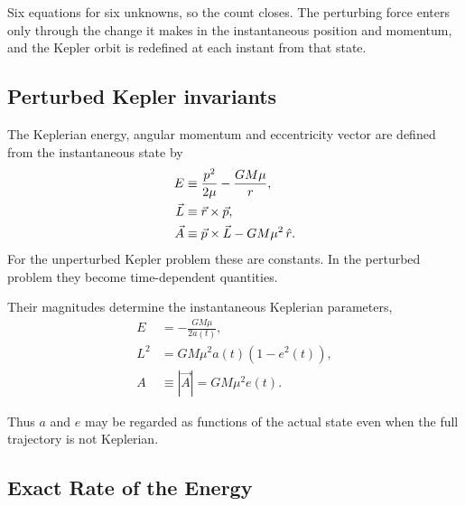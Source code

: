 	Six equations for six unknowns, so the count closes. The perturbing force enters only through the change it makes in the instantaneous position and momentum, and the Kepler orbit is redefined at each instant from that state.
	
	\subsection{Perturbed Kepler invariants}
	
	The Keplerian energy, angular momentum and eccentricity vector are
	defined from the instantaneous state by
	\begin{align}
		E
		&\equiv
		\frac{p^2}{2\mu}-\frac{GM\mu}{r},
		\label{eq:pert_E_def}
		\\
		\vec L
		&\equiv
		\vec r\times\vec p,
		\label{eq:pert_L_def}
		\\
		\vec A
		&\equiv\vec p\times\vec L-GM\mu^2\,\hat r .\label{eq:pert_A_def}
	\end{align}
	For the unperturbed Kepler problem these are constants.  In the
	perturbed problem they become time-dependent quantities.
	
	Their magnitudes determine the instantaneous Keplerian parameters,
	\begin{align}
		E&=-\frac{GM\mu}{2a(t)},
		\label{eq:instantaneous_E_a}
		\\
		L^2&=GM\mu^2a(t)(1-e^2(t)),
		\label{eq:instantaneous_L_ae}
		\\
		A&\equiv|\vec A|=GM\mu^2e(t) .
		\label{eq:instantaneous_A_e}
	\end{align}
	
	Thus $a$ and $e$ may be regarded as functions of the actual state even
	when the full trajectory is not Keplerian.
	
	\subsection{Exact Rate of the Energy}
	
